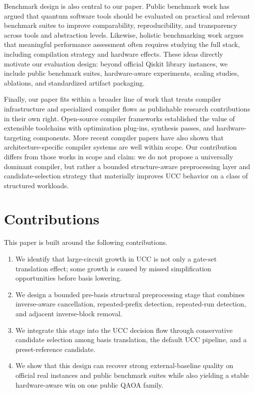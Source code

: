 \documentclass[11pt]{article}
\begin{document}
Benchmark design is also central to our paper. Public benchmark work has argued that quantum software tools should be evaluated on practical and relevant benchmark suites to improve comparability, reproducibility, and transparency across tools and abstraction levels. Likewise, holistic benchmarking work argues that meaningful performance assessment often requires studying the full stack, including compilation strategy and hardware effects. These ideas directly motivate our evaluation design: beyond official Qiskit library instances, we include public benchmark suites, hardware-aware experiments, scaling studies, ablations, and standardized artifact packaging.

Finally, our paper fits within a broader line of work that treats compiler infrastructure and specialized compiler flows as publishable research contributions in their own right. Open-source compiler frameworks established the value of extensible toolchains with optimization plug-ins, synthesis passes, and hardware-targeting components. More recent compiler papers have also shown that architecture-specific compiler systems are well within scope. Our contribution differs from those works in scope and claim: we do not propose a universally dominant compiler, but rather a bounded structure-aware preprocessing layer and candidate-selection strategy that materially improves UCC behavior on a class of structured workloads.

\section{Contributions}

This paper is built around the following contributions.

\begin{enumerate}[leftmargin=1.5em]
    \item We identify that large-circuit growth in UCC is not only a gate-set translation effect; some growth is caused by missed simplification opportunities before basis lowering.
    \item We design a bounded pre-basis structural preprocessing stage that combines inverse-aware cancellation, repeated-prefix detection, repeated-run detection, and adjacent inverse-block removal.
    \item We integrate this stage into the UCC decision flow through conservative candidate selection among basis translation, the default UCC pipeline, and a preset-reference candidate.
    \item We show that this design can recover strong external-baseline quality on official real instances and public benchmark suites while also yielding a stable hardware-aware win on one public QAOA family.
\end{enumerate}
\end{document}
